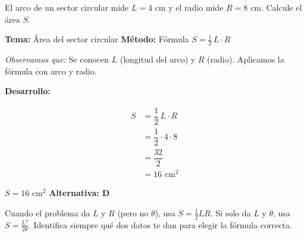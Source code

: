 \vspace{0.4cm}

\begin{tcolorbox}[
  enhanced, breakable,
  colback=GrisClaro, colframe=AzulPizarra,
  fonttitle=\bfseries\sffamily\color{white},
  title={Trigonometría — Ejercicio 2},
  arc=3pt, boxrule=0.8pt
]

\begin{problema}
  El arco de un sector circular mide $L = 4$ cm y el radio mide $R = 8$ cm.
  Calcule el área $S$.
\end{problema}

\smallskip
\noindent
\textbf{\sffamily\color{AzulMedio}Tema:} Área del sector circular \hfill
\textbf{\sffamily\color{AzulMedio}Método:} Fórmula $S = \tfrac{1}{2}\,L\cdot R$

\medskip
\noindent\textit{Observamos que:} Se conocen $L$ (longitud del arco) y $R$ (radio).
Aplicamos la fórmula con arco y radio.

\noindent\textbf{\sffamily Desarrollo:}

\begin{minipage}{0.35\linewidth}
\centering
{}
\end{minipage}
\hfill
\begin{minipage}{0.60\linewidth}
\begin{align*}
  S &= \dfrac{1}{2}\,L \cdot R \\[6pt]
    &= \dfrac{1}{2} \cdot 4 \cdot 8 \\[6pt]
    &= \dfrac{32}{2} \\[6pt]
    &= 16 \text{ cm}^2
\end{align*}
\end{minipage}

\begin{tcolorbox}[
  colback=AzulClaro!60, colframe=AzulPizarra,
  arc=2pt, boxrule=0.8pt, left=8pt, right=8pt
]
\centering
$\displaystyle S = 16 \text{ cm}^2$
\quad\textbf{Alternativa: D}
\end{tcolorbox}

\begin{cajatip}
Cuando el problema da $L$ y $R$ (pero no $\theta$), usa $S = \tfrac{1}{2}LR$.
Si solo da $L$ y $\theta$, usa $S = \tfrac{L^2}{2\theta}$.
Identifica siempre qué dos datos te dan para elegir la fórmula correcta.
\end{cajatip}

\end{tcolorbox}

